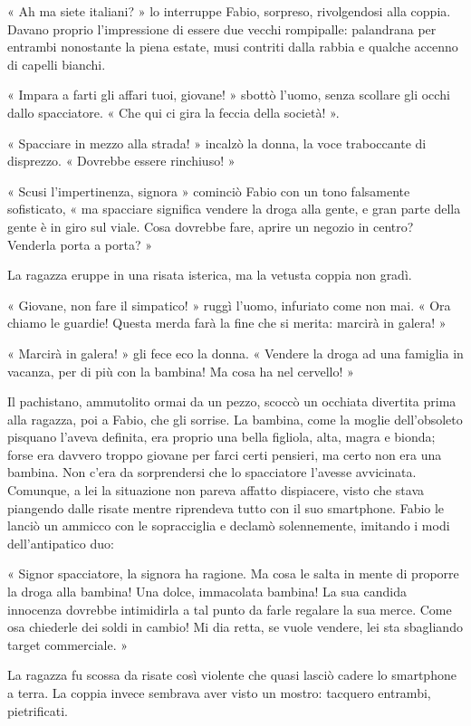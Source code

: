 « Ah ma siete italiani? » lo interruppe Fabio, sorpreso, rivolgendosi alla coppia. Davano proprio l'impressione di essere due vecchi rompipalle: palandrana per entrambi nonostante la piena estate, musi contriti dalla rabbia e qualche accenno di capelli bianchi.

« Impara a farti gli affari tuoi, giovane! » sbottò l'uomo, senza scollare gli occhi dallo spacciatore. « Che qui ci gira la feccia della società! ».

« Spacciare in mezzo alla strada! » incalzò la donna, la voce traboccante di disprezzo. « Dovrebbe essere rinchiuso! »

« Scusi l'impertinenza, signora » cominciò Fabio con un tono falsamente sofisticato, « ma spacciare significa vendere la droga alla gente, e gran parte della gente è in giro sul viale. Cosa dovrebbe fare, aprire un negozio in centro? Venderla porta a porta? »

La ragazza eruppe in una risata isterica, ma la vetusta coppia non gradì.

« Giovane, non fare il simpatico! » ruggì l'uomo, infuriato come non mai. « Ora chiamo le guardie! Questa merda farà la fine che si merita: marcirà in galera! »

« Marcirà in galera! » gli fece eco la donna. « Vendere la droga ad una famiglia in vacanza, per di più con la bambina! Ma cosa ha nel cervello! »

Il pachistano, ammutolito ormai da un pezzo, scoccò un occhiata divertita prima alla ragazza, poi a Fabio, che gli sorrise. La bambina, come la moglie dell'obsoleto pisquano l'aveva definita, era proprio una bella figliola, alta, magra e bionda; forse era davvero troppo giovane per farci certi pensieri, ma certo non era una bambina. Non c'era da sorprendersi che lo spacciatore l'avesse avvicinata. Comunque, a lei la situazione non pareva affatto dispiacere, visto che stava piangendo dalle risate mentre riprendeva tutto con il suo smartphone. Fabio le lanciò un ammicco con le sopracciglia e declamò solennemente, imitando i modi dell'antipatico duo:

« Signor spacciatore, la signora ha ragione. Ma cosa le salta in mente di proporre la droga alla bambina! Una dolce, immacolata bambina! La sua candida innocenza dovrebbe intimidirla a tal punto da farle regalare la sua merce. Come osa chiederle dei soldi in cambio! Mi dia retta, se vuole vendere, lei sta sbagliando target commerciale. »

La ragazza fu scossa da risate così violente che quasi lasciò cadere lo smartphone a terra. La coppia invece sembrava aver visto un mostro: tacquero entrambi, pietrificati.

